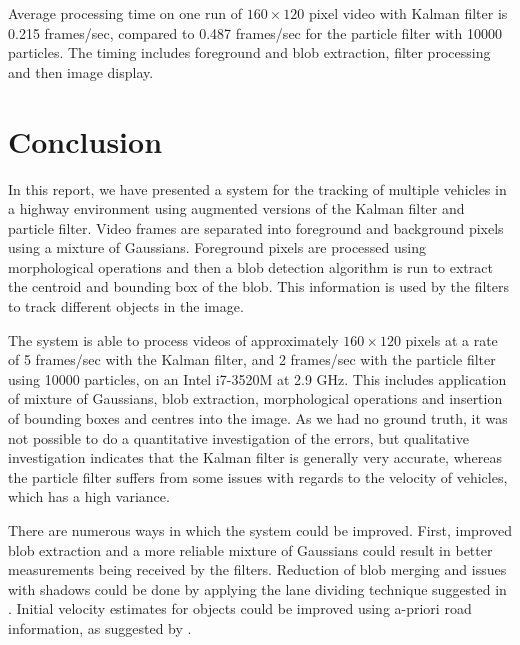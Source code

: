 \documentclass[conference]{IEEEtran}
\begin{document}
Average processing time on one run of $160\times 120$ pixel video with Kalman
filter is 0.215 frames/sec, compared to 0.487 frames/sec for the particle filter
with 10000 particles. The timing includes foreground and blob extraction, filter
processing and then image display. 


\section{Conclusion}
In this report, we have presented a system for the tracking of multiple vehicles in a highway
environment using augmented versions of the Kalman filter and particle
filter. Video frames are separated into foreground and background pixels using a
mixture of Gaussians. Foreground pixels are processed using morphological
operations and then a blob detection algorithm is run to extract the centroid
and bounding box of the blob. This information is used by the filters to track
different objects in the image.

The system is able to process videos of approximately $160\times 120$ pixels at
a rate of 5 frames/sec with the Kalman filter, and 2 frames/sec with the
particle filter using 10000 particles, on an Intel i7-3520M at 2.9 GHz. This
includes application of mixture of Gaussians, blob extraction, morphological
operations and insertion of bounding boxes and centres into the image. As we had
no ground truth, it was not possible to do a quantitative investigation of the
errors, but qualitative investigation indicates that the Kalman filter is
generally very accurate, whereas the particle filter suffers from some issues
with regards to the velocity of vehicles, which has a high variance.

There are numerous ways in which the system could be improved. First, improved
blob extraction and a more reliable mixture of Gaussians could result in better
measurements being received by the filters. Reduction of blob merging and issues
with shadows could be done by applying the lane dividing technique suggested in
\cite{hsieh2006automatic}. Initial velocity estimates for objects could be
improved using a-priori road information, as suggested by
\cite{magee2004tracking}.

\printbibliography
\end{document}
